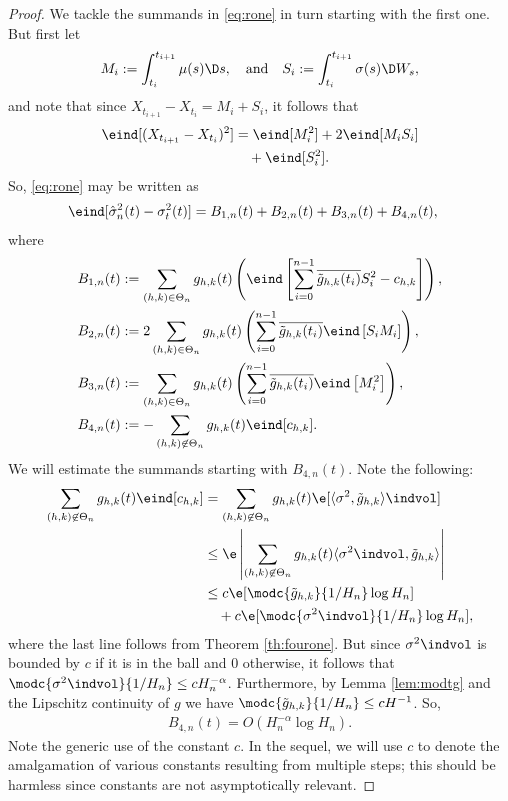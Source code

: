 \begin{appendices}
\begin{proof}
We tackle the summands in \eqref{eq:rone} in turn starting with the first one. But first let 
\begin{align}
  M_i := \int_{t_i}^{t_{i+1}} \mu(s) \D s, \quad \text{and} \quad  S_i := \int_{t_i}^{t_{i+1}} \sigma(s) \D W_s, \notag
\end{align}
and note that since $X_{t_{i+1}} - X_{t_i} = M_i + S_i$, it follows that
\begin{align}
  \eind[(X_{t_{i+1}} - X_{t_i})^2] &= \eind[M_i^2]  
  + 2\eind[M_iS_i] \notag\\ & \quad+ \eind[S_i^2].\notag 
\end{align}
So, \eqref{eq:rone} may be written as 
\begin{align}
  &\eind[\svn(t) - \sv(t)] = B_{1,n}(t) + B_{2,n}(t) + B_{3,n}(t) + B_{4,n}(t), \notag
\end{align}
where
\begin{align}
  &B_{1,n}(t) :=  \sumt g_{h,k}(t) \left(\eind\left[ \sum_{i=0}^{n-1} \btghki S_i^2  - \chk\right]\right), \notag\\
  &B_{2,n}(t) := 2 \sumt g_{h,k}(t)\left(\sum_{i=0}^{n-1} \btghki \eind\left[S_i M_i\right] \right), \notag\\
  &B_{3,n}(t) := \sumt g_{h,k}(t)\left( \sum_{i=0}^{n-1} \btghki \eind\left[M_i^2\right] \right), \notag\\
  &B_{4,n}(t) := - \sum_{\substack{(h,k) \not\in \Theta_n }}g_{h,k}(t)\eind[\chk]. 
  \label{}
\end{align}
We will estimate the summands starting with $B_{4,n}(t)$. Note the following:
\begin{align}
  \sum_{\substack{(h,k) \not\in \Theta_n }}g_{h,k}(t)\eind[\chk] &=  \sum_{\substack{(h,k) \not\in \Theta_n }}g_{h,k}(t)\e[\inner{\sigma^2}{ \tghk}\indvol] \notag\\ 
&\le  \e\left\vert\sum_{\substack{(h,k) \not\in \Theta_n }}g_{h,k}(t)\inner{\sigma^2 \indvol}{ \tghk}\right\vert \notag\\
&\le c\e[\modc{\tghk}{1/H_n}\log H_n] \notag \\
&\quad + c\e[\modc{\sigma^2\indvol}{1/H_n} \log H_n]\notag,
\end{align}
where the last  line follows from Theorem \eqref{th:fourone}. But since  $\sigma^2 \indvol$ is bounded by $c$ if it is in the \holder ball   and $0$ otherwise, it follows that $\modc{\sigma^2\indvol}{1/H_n} \le c H_n^{-\alpha}$. Furthermore, by Lemma \eqref{lem:modtg} and the Lipschitz continuity of $g$ we have $\modc{\tghk}{1/H_n} \le c H^{-1}$.  So,  
\begin{align}
 B_{4,n}(t) =  O( H_n^{-\alpha}\log H_n).
  \label{eq:B4}
\end{align}
Note the generic use of the constant  $c$. In the sequel, we will use $c$ to denote the amalgamation of various constants resulting from multiple steps; this should be harmless since  constants are not asymptotically relevant. 


\end{proof}
\end{appendices}
